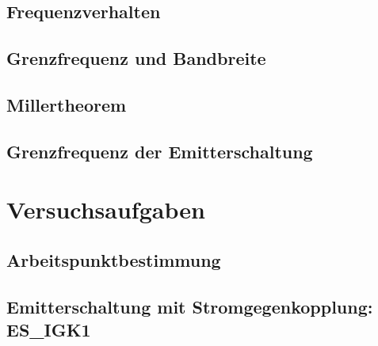 \documentclass[a4paper, 12pt]{article}
\begin{document}
\subsection{Frequenzverhalten}


\subsection{Grenzfrequenz und Bandbreite}


\subsection{Millertheorem}


\subsection{Grenzfrequenz der Emitterschaltung}


  
  \clearpage
  \setcounter{page}{1}

\section{Versuchsaufgaben} 

\setcounter{subsection}{1}
\subsection{Arbeitspunktbestimmung}


\subsection{Emitterschaltung mit Stromgegenkopplung: ES\_IGK1}

\end{document}
